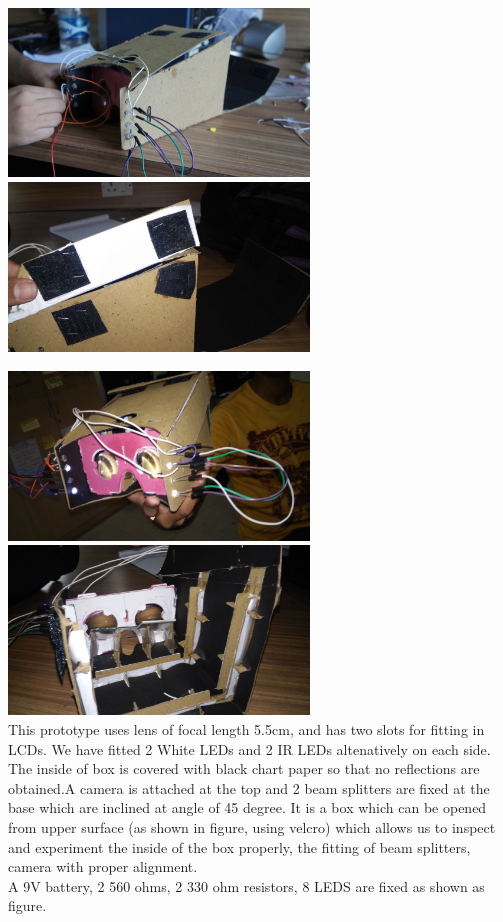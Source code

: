\documentclass[12pt]{article}
\begin{document}
\includegraphics[width=8cm]{DSC03895} 
\includegraphics[width=8cm]{20141225_162318} 


\includegraphics[width=8cm]{20141225_172947} 
\includegraphics[width=8cm]{20141225_162310} \\


This prototype uses lens of focal length 5.5cm, and has two slots for fitting in LCDs. We have fitted 2 White LEDs and 2 IR LEDs altenatively on each side. The inside of box is covered with black chart paper so that no reflections are obtained.A camera is attached at the top  and 2 beam splitters are fixed at the base which are inclined at angle of 45 degree. It is a box which can be opened from upper surface (as shown in figure, using velcro) which allows us to inspect and experiment the inside of the box properly, the fitting of beam splitters, camera with proper alignment. \\
A  9V battery, 2 560 ohms, 2 330 ohm resistors, 8 LEDS are fixed as shown as figure.\\
\end{document}
